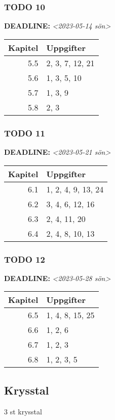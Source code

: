 \documentclass[11pt]{article}
\begin{document}
\subsubsection{{\bfseries\sffamily TODO} 10}
\label{sec:orgdba6b40}
\noindent\textbf{DEADLINE:} \textit{<2023-05-14 sön>}\\[0pt]

\begin{center}
\begin{tabular}{rl}
Kapitel & Uppgifter\\[0pt]
\hline
5.5 & 2, 3, 7, 12, 21\\[0pt]
5.6 & 1, 3, 5, 10\\[0pt]
5.7 & 1, 3, 9\\[0pt]
5.8 & 2, 3\\[0pt]
\end{tabular}
\end{center}

\subsubsection{{\bfseries\sffamily TODO} 11}
\label{sec:org93caa56}
\noindent\textbf{DEADLINE:} \textit{<2023-05-21 sön>}\\[0pt]

\begin{center}
\begin{tabular}{rl}
Kapitel & Uppgifter\\[0pt]
\hline
6.1 & 1, 2, 4, 9, 13, 24\\[0pt]
6.2 & 3, 4, 6, 12, 16\\[0pt]
6.3 & 2, 4, 11, 20\\[0pt]
6.4 & 2, 4, 8, 10, 13\\[0pt]
\end{tabular}
\end{center}

\subsubsection{{\bfseries\sffamily TODO} 12}
\label{sec:org35c184e}
\noindent\textbf{DEADLINE:} \textit{<2023-05-28 sön>}\\[0pt]

\begin{center}
\begin{tabular}{rl}
Kapitel & Uppgifter\\[0pt]
\hline
6.5 & 1, 4, 8, 15, 25\\[0pt]
6.6 & 1, 2, 6\\[0pt]
6.7 & 1, 2, 3\\[0pt]
6.8 & 1, 2, 3, 5\\[0pt]
\end{tabular}
\end{center}

\subsection{Krysstal}
\label{sec:orga13f933}
3 st krysstal
\end{document}

